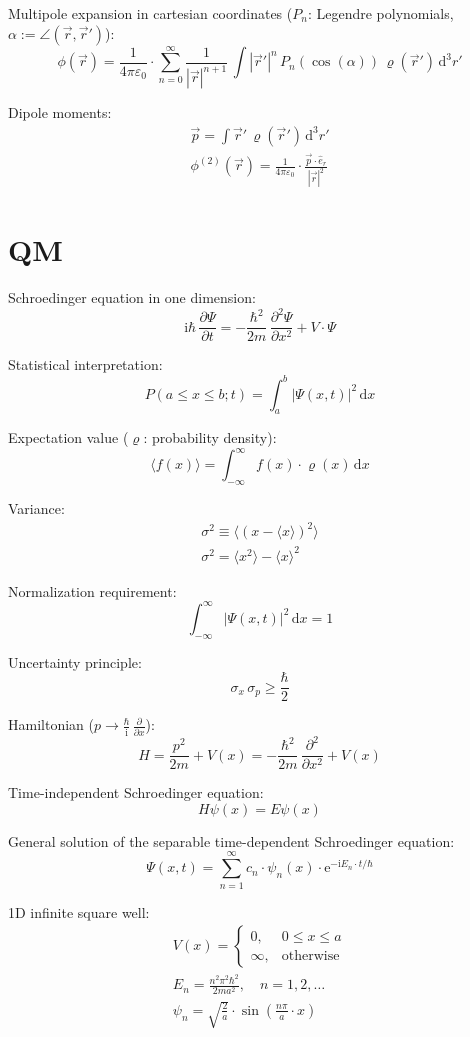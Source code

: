 \documentclass[fontsize=11pt,a4paper]{scrartcl}
\begin{document}
Multipole expansion in cartesian coordinates ($P_n$: Legendre polynomials, $\alpha:=\angle\left(\vec r,\vec r'\right)$):
\[
	\phi(\vec r)=\frac{1}{4\pi\varepsilon_0}\cdot\sum_{n=0}^\infty\frac{1}{|\vec r|^{n+1}}\,\int|\vec r'|^n\,P_n\left(\cos(\alpha)\right)\,\varrho(\vec r')\,\mathrm{d}^3 r'
\]

Dipole moments:
\begin{gather*}
	\vec p=\int\vec r'\,\varrho(\vec r')\,\mathrm{d}^3 r'\\
	\phi^{(2)}(\vec r)=\frac{1}{4\pi\varepsilon_0}\cdot\frac{\vec p\cdot\hat e_r}{|\vec r|^2}
\end{gather*}
%
%
%
%
%
\section{QM}
Schroedinger equation in one dimension:
\[
	\mathrm{i}\hbar\,\frac{\partial\Psi}{\partial t}=-\frac{\hbar^2}{2m}\,\frac{\partial^2\Psi}{\partial x^2}+V\cdot\Psi
\]

Statistical interpretation:
\[
	P(a\le x\le b; t)=\int_a^b |\Psi(x,t)|^2\,\mathrm{d}x
\]

Expectation value ($\varrho$: probability density):
\[
	\langle f(x)\rangle=\int_{-\infty}^\infty f(x)\cdot\varrho(x)\,\mathrm{d}x
\]

Variance:
\begin{gather*}
	\sigma^2\equiv\langle\left(x-\langle x\rangle\right)^2\rangle\\
	\sigma^2=\langle x^2\rangle - \langle x\rangle^2
\end{gather*}

Normalization requirement:
\[
	\int_{-\infty}^\infty |\Psi(x,t)|^2\,\mathrm{d}x = 1
\]

Uncertainty principle:
\[
	\sigma_x\,\sigma_p\ge\frac{\hbar}{2}
\]

Hamiltonian ($p\to\frac{\hbar}{\mathrm{i}}\,\frac{\partial}{\partial x}$):
\[
	H=\frac{p^2}{2m}+V(x)=-\frac{\hbar^2}{2m}\,\frac{\partial^2}{\partial x^2}+V(x)
\]

Time-independent Schroedinger equation:
\[
	H\psi(x)=E\psi(x)
\]

General solution of the separable time-dependent Schroedinger equation:
\[
	\Psi(x,t)=\sum_{n=1}^\infty c_n\cdot\psi_n(x)\cdot\mathrm{e}^{-\mathrm{i} E_n\cdot t/\hbar}
\]

1D infinite square well:
\begin{gather*}
	V(x)=\begin{cases}
		0, & 0\le x\le a\\
		\infty, & \text{otherwise}
	\end{cases}\\
	E_n = \frac{n^2\pi^2\hbar^2}{2ma^2}, \quad n=1,2,\dots\\
	\psi_n = \sqrt{\frac{2}{a}}\cdot\sin\left(\frac{n\pi}{a}\cdot x\right)
\end{gather*}
\end{document}
